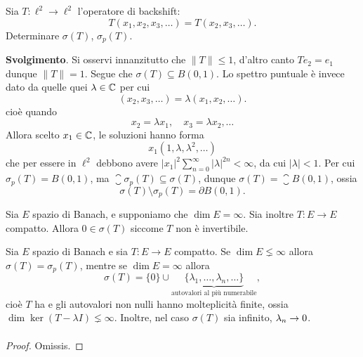 \begin{exercise}
	Sia $T: \ell^2 \to \ell^2$ l'operatore di backshift:
	\begin{equation*}
		T(x_1, x_2, x_3, \ldots) = T(x_2, x_3, \ldots).
	\end{equation*}
	Determinare $\sigma(T)$, $\sigma_p(T)$.

	\textbf{Svolgimento}.
	Si osservi innanzitutto che $\|T\| \leq 1$, d'altro canto $Te_2 = e_1$ dunque $\|T\| = 1$. Segue che $\sigma(T) \subseteq B(0,1)$. Lo spettro puntuale è invece dato da quelle quei $\lambda \in \mathbb{C}$ per cui
	\begin{equation*}
		(x_2, x_3, \ldots) = \lambda (x_1, x_2, \ldots).
	\end{equation*}
	cioè quando
	\begin{equation*}
		x_2 = \lambda x_1, \quad x_3 = \lambda x_2, \ldots
	\end{equation*}
	Allora scelto $x_1 \in \mathbb{C}$, le soluzioni hanno forma
	\begin{equation*}
		x_1 (1, \lambda, \lambda^2, \ldots)
	\end{equation*}
	che per essere in $\ell^2$ debbono avere $|x_1|^2\sum_{n=0}^\infty |\lambda|^{2n} < \infty$, da cui $|\lambda| < 1$. Per cui $\sigma_p(T) = B(0,1)$, ma $\closure{\sigma_p(T)} \subseteq \sigma(T)$, dunque $\sigma(T) = \closure B(0,1)$, ossia
	\begin{equation*}
		\sigma(T) \setminus \sigma_p(T) = \partial B(0,1).
	\end{equation*}
\end{exercise}

\begin{remark}
	Sia $E$ spazio di Banach, e supponiamo che $\dim E = \infty$. Sia inoltre $T:E \to E$ compatto. Allora $0 \in \sigma(T)$ siccome $T$ non è invertibile.
\end{remark}

\begin{theorem}
\label{th:riesz_schauder}
	Sia $E$ spazio di Banach e sia $T:E \to E$ compatto.
	Se $\dim E \lneq \infty$ allora $\sigma(T) = \sigma_p(T)$, mentre se $\dim E = \infty$ allora
	\begin{equation*}
		\sigma(T) = \{0\} \cup \underbrace{\{\lambda_1, \ldots, \lambda_n, \ldots\}}_{\text{autovalori al più numerabile}},
	\end{equation*}
	cioè $T$ ha  e gli autovalori non nulli hanno molteplicità finite, ossia $\dim \ker(T-\lambda I) \lneq \infty$.
	Inoltre, nel caso $\sigma(T)$ sia infinito, $\lambda_n \underset{{}}{\rightarrow} 0$.
\end{theorem}
\begin{proof}
	Omissis.
\end{proof}

